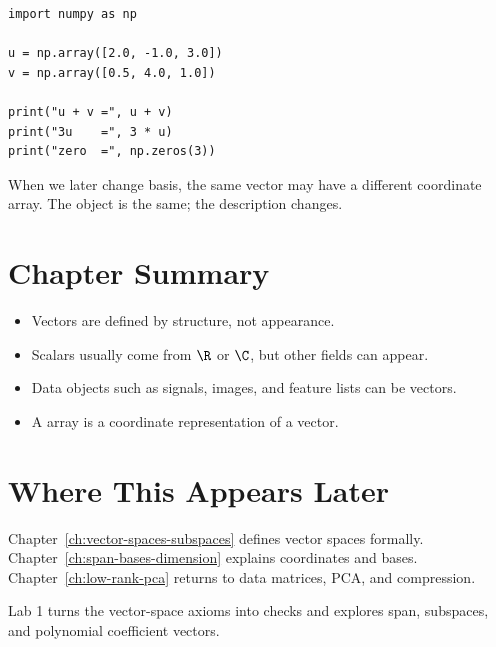 \begin{lstlisting}
import numpy as np

u = np.array([2.0, -1.0, 3.0])
v = np.array([0.5, 4.0, 1.0])

print("u + v =", u + v)
print("3u    =", 3 * u)
print("zero  =", np.zeros(3))
\end{lstlisting}

When we later change basis, the same vector may have a different coordinate
array. The object is the same; the description changes.

\section*{Chapter Summary}

\begin{itemize}
  \item Vectors are defined by structure, not appearance.
  \item Scalars usually come from $\R$ or $\C$, but other fields can appear.
  \item Data objects such as signals, images, and feature lists can be vectors.
  \item A \NumPy array is a coordinate representation of a vector.
\end{itemize}

\section*{Where This Appears Later}

Chapter~\ref{ch:vector-spaces-subspaces} defines vector spaces formally.
Chapter~\ref{ch:span-bases-dimension} explains coordinates and bases.
Chapter~\ref{ch:low-rank-pca} returns to data matrices, PCA, and compression.

\begin{labbox}
Lab 1 turns the vector-space axioms into \Python checks and explores span,
subspaces, and polynomial coefficient vectors.
\end{labbox}


